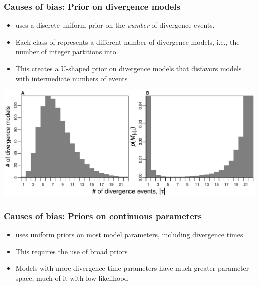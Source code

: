 \begin{frame}
    \frametitle{Causes of bias: Prior on divergence models}
    \begin{itemize}
        \item \msb uses a discrete uniform prior on the \emph{number} of
            divergence events, \divTimeNum
        \item Each class of \divTimeNum represents a different number of
            divergence models, i.e., the number of integer partitions
            \divTimeNum into \npairs{}
        \item This creates a U-shaped prior on divergence models that disfavors
            models with intermediate numbers of events
    \end{itemize}
    \centerline{
    \includegraphics[width=\textwidth]{images/partition_numbers.pdf}}
\end{frame}

\begin{frame}
    \frametitle{Causes of bias: Priors on continuous parameters}
    \begin{itemize}
        \item<1-> \msb uses uniform priors on most model parameters, including
            divergence times
        \item<2-> This requires the use of broad priors
        \item<3-> Models with more divergence-time parameters have much greater
            parameter space, much of it with low likelihood
    \end{itemize}
\end{frame}

